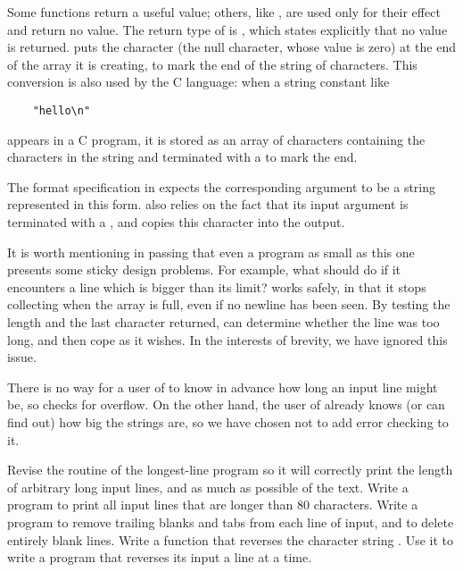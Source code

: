 Some functions return a useful value; others, like , are used only for their effect and return no value.
The return type of  is , which states explicitly that no value is returned.
 puts the character  (the null character, whose value is zero) at the end of the array it is creating, to mark the end of the string of characters.
This conversion is also used by the C language: when a string constant like
\begin{lstlisting}
	"hello\n"
\end{lstlisting}
appears in a C program, it is stored as an array of characters containing the characters in the string and terminated with a  to mark the end.

The  format specification in  expects the corresponding argument to be a string represented in this form.
 also relies on the fact that its input argument is terminated with a , and copies this character into the output.

It is worth mentioning in passing that even a program as small as this one presents some sticky design problems.
For example, what should  do if it encounters a line which is bigger than its limit?
 works safely, in that it stops collecting when the array is full, even if no newline has been seen.
By testing the length and the last character returned,  can determine whether the line was too long, and then cope as it wishes.
In the interests of brevity, we have ignored this issue.

There is no way for a user of  to know in advance how long an input line might be, so  checks for overflow.
On the other hand, the user of  already knows (or can find out) how big the strings are, so we have chosen not to add error checking to it.
\newline

\begin{ExerciseList}
\Exercise Revise the  routine of the longest-line program so it will correctly print the length of arbitrary long input lines, and as much as possible of the text.
\Exercise Write a program to print all input lines that are longer than 80 characters.
\Exercise Write a program to remove trailing blanks and tabs from each line of input, and to delete entirely blank lines.
\Exercise Write a function  that reverses the character string . Use it to write a program that reverses its input a line at a time.
\end{ExerciseList}




